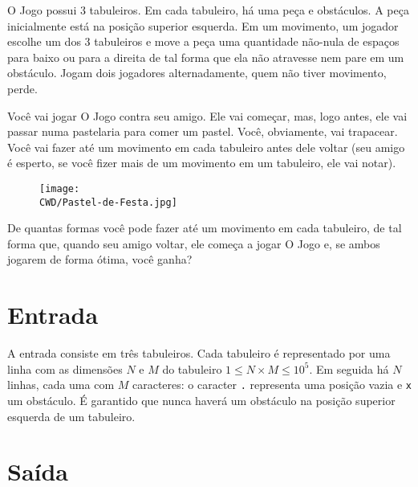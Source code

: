 %

O Jogo possui 3 tabuleiros. Em cada tabuleiro, há uma peça e obstáculos. A peça inicialmente está na posição superior esquerda. Em um movimento, um jogador escolhe um dos 3 tabuleiros e move a peça uma quantidade não-nula de espaços para baixo ou para a direita de tal forma que ela não atravesse nem pare em um obstáculo. Jogam dois jogadores alternadamente, quem não tiver movimento, perde.

Você vai jogar O Jogo contra seu amigo. Ele vai começar, mas, logo antes, ele vai passar numa pastelaria para comer um pastel. Você, obviamente, vai trapacear. Você vai fazer até um movimento em cada tabuleiro antes dele voltar (seu amigo é esperto, se você fizer mais de um movimento em um tabuleiro, ele vai notar).

\begin{figure}[H]
    \centering
    \texttt{[image: \\CWD/Pastel-de-Festa.jpg]}
  \end{figure}

De quantas formas você pode fazer até um movimento em cada tabuleiro, de tal forma que, quando seu amigo voltar, ele começa a jogar O Jogo e, se ambos jogarem de forma ótima, você ganha?

%
%

\section*{Entrada}

A entrada consiste em três tabuleiros. Cada tabuleiro é representado por uma linha com as dimensões $N$ e $M$ do tabuleiro $1 \leq N\times M \leq 10^5$. Em seguida há $N$ linhas, cada uma com $M$ caracteres: o caracter {\tt .} representa uma posição vazia e {\tt x} um obstáculo. É garantido que nunca haverá um obstáculo na posição superior esquerda de um tabuleiro.

%
%

\section*{Saída}

